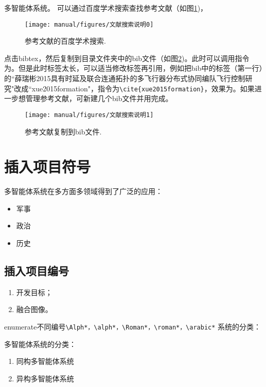 多智能体系统\citep{cao2011formation}。
可以通过百度学术搜索查找参考文献（如图\ref{fig_search0})，
 \begin{figure}[!htb]
  \centering
  \texttt{[image: manual/figures/文献搜索说明0]}
  \caption{参考文献的百度学术搜索.}
  \label{fig_search0}
\end{figure}
点击bibtex，然后复制到目录文件夹中的bib文件（如图\ref{fig_search1})。此时可以调用指令为\citep{薛瑞彬2015具有时延及联合连通拓扑的多飞行器分布式协同编队飞行控制研究}。但是此时标签太长，可以适当修改标签再引用，例如把bib中的标签（第一行）的``薛瑞彬2015具有时延及联合连通拓扑的多飞行器分布式协同编队飞行控制研究"改成``xue2015formation"，指令为\verb+\cite{xue2015formation}+，效果为\cite{xue2015formation}。如果进一步想管理参考文献，可新建几个bib文件并用\verb++完成。
 \begin{figure}[!htb]
  \centering
  \texttt{[image: manual/figures/文献搜索说明1]}
  \caption{参考文献复制到bib文件.}
  \label{fig_search1}
\end{figure}



\section{插入项目符号}

多智能体系统在多方面多领域得到了广泛的应用：
\begin{itemize}
  \item 军事
  \item 政治
  \item 历史
\end{itemize}

\subsection{插入项目编号}

\begin{enumerate}[leftmargin=2em,itemsep=2pt,topsep=0pt,parsep=0pt,label=\alph*)]
  \item 开发目标；
  \item 融合图像。
\end{enumerate}

enumerate不同编号\verb+\Alph*，\alph*，\Roman*，\roman*，\arabic*+
系统的分类：

多智能体系统的分类：
\begin{enumerate}
  \item 同构多智能体系统
  \item 异构多智能体系统
\end{enumerate}


